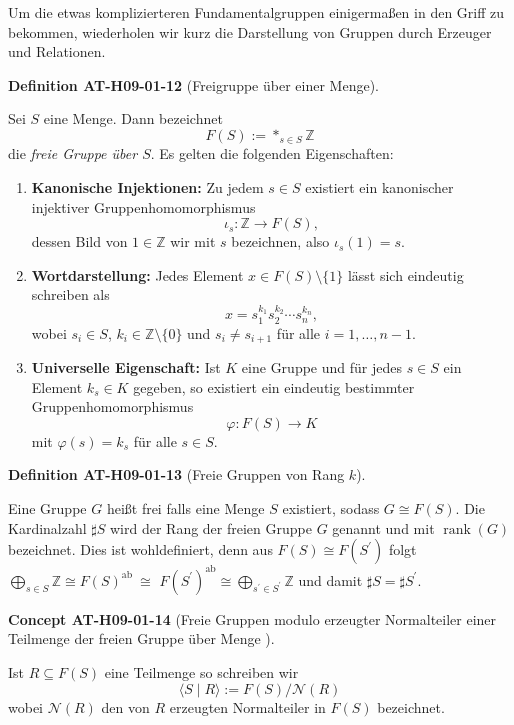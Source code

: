 \documentclass[10pt, letterpaper]{article}
\newcommand{\CustomHeading}[3]{%
  \par\medskip\noindent%
  \textbf{#1 #2} \textnormal{(#3)}.\enskip%
}
\newenvironment{DEF}[2]{\begin{unitbox}\CustomHeading{Definition}{#1}{#2}}{\end{unitbox}}
\newenvironment{CONC}[2]{\begin{unitbox}\CustomHeading{Concept}{#1}{#2}}{\end{unitbox}}
\begin{document}
Um die etwas komplizierteren Fundamentalgruppen einigermaßen in den Griff zu bekommen, wiederholen wir kurz die Darstellung von Gruppen durch Erzeuger und Relationen. 


\begin{DEF}{AT-H09-01-12}{Freigruppe über einer Menge}
Sei $S$ eine Menge. Dann bezeichnet
\[
F(S) := *_{s \in S} \mathbb{Z}
\]
die \emph{freie Gruppe über $S$}. Es gelten die folgenden Eigenschaften:

\begin{enumerate}[label=(\roman*)]
  \item \textbf{Kanonische Injektionen:}  
  Zu jedem $s \in S$ existiert ein kanonischer injektiver Gruppenhomomorphismus
  \[
  \iota_s : \mathbb{Z} \rightarrow F(S),
  \]
  dessen Bild von $1 \in \mathbb{Z}$ wir mit $s$ bezeichnen, also $\iota_s(1) = s$.

  \item \textbf{Wortdarstellung:}  
  Jedes Element $x \in F(S) \setminus \{1\}$ lässt sich eindeutig schreiben als
  \[
  x = s_1^{k_1} s_2^{k_2} \cdots s_n^{k_n},
  \]
  wobei $s_i \in S$, $k_i \in \mathbb{Z} \setminus \{0\}$ und $s_i \neq s_{i+1}$ für alle $i = 1, \dots, n-1$.

  \item \textbf{Universelle Eigenschaft:}  
  Ist $K$ eine Gruppe und für jedes $s \in S$ ein Element $k_s \in K$ gegeben, so existiert ein eindeutig bestimmter Gruppenhomomorphismus
  \[
  \varphi : F(S) \longrightarrow K
  \]
  mit $\varphi(s) = k_s$ für alle $s \in S$.
\end{enumerate}
\end{DEF}



\begin{DEF}{AT-H09-01-13}{Freie Gruppen von Rang $k$}
Eine Gruppe $G$ heißt frei falls eine Menge $S$ existiert, sodass $G \cong F(S)$. Die Kardinalzahl $\sharp S$ wird der Rang der freien Gruppe $G$ genannt und mit $\operatorname{rank}(G)$ bezeichnet. Dies ist wohldefiniert, denn aus $F(S) \cong F\left(S^{\prime}\right)$ folgt $\bigoplus_{s \in S} \mathbb{Z} \cong F(S)^{\text {ab }} \cong$ $F\left(S^{\prime}\right)^{\mathrm{ab}} \cong \bigoplus_{s^{\prime} \in S^{\prime}} \mathbb{Z}$ und damit $\sharp S=\sharp S^{\prime}$.
\end{DEF}

\begin{CONC}{AT-H09-01-14}{Freie Gruppen modulo erzeugter Normalteiler einer Teilmenge der freien Gruppe über Menge }
Ist $R \subseteq F(S)$ eine Teilmenge so schreiben wir 
$$\langle S \mid R\rangle:=F(S) / \mathcal{N}(R)$$ 
wobei $\mathcal{N}(R)$ den von $R$ erzeugten Normalteiler in $F(S)$ bezeichnet.
\end{CONC}
\end{document}
